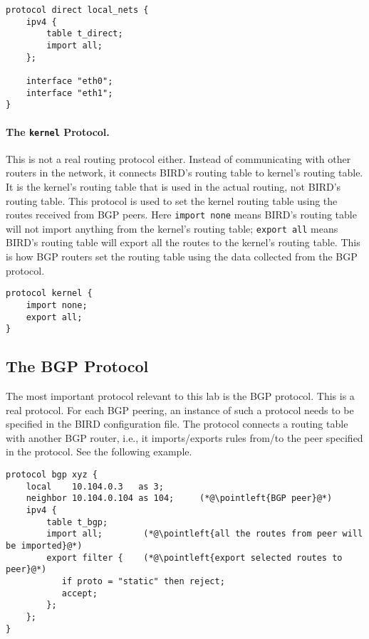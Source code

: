 \begin{lstlisting}
protocol direct local_nets {
    ipv4 {
        table t_direct;
        import all;
    };

    interface "eth0";
    interface "eth1";
}
\end{lstlisting}


\paragraph{The \texttt{kernel} Protocol.} 
This is not a real routing protocol either.
Instead of communicating with other routers in the network, it connects
BIRD's routing table to kernel's routing table. It is the kernel's routing table
that is used in the actual routing, not BIRD's routing table.
This protocol is used to set the kernel routing table using the routes
received from BGP peers. Here
\texttt{import none} means BIRD's routing table will not import anything from
the kernel's routing table; \texttt{export all} means BIRD's routing table
will export all the routes to the kernel's routing table. This is how BGP
routers set the routing table using the data collected from the BGP
protocol.

\begin{lstlisting}
protocol kernel {
    import none;
    export all;
}
\end{lstlisting}



\subsection{The BGP Protocol} 

The most important protocol relevant to this lab is the BGP protocol.
This is a real protocol. For each BGP peering, an instance of 
such a protocol needs to be specified in the BIRD configuration 
file. The protocol connects a routing table with another 
BGP router, i.e., it imports/exports rules from/to 
the peer specified in the protocol.
See the following example. 

\begin{lstlisting}
protocol bgp xyz {
    local    10.104.0.3   as 3;
    neighbor 10.104.0.104 as 104;     (*@\pointleft{BGP peer}@*)
    ipv4 {
        table t_bgp;
        import all;        (*@\pointleft{all the routes from peer will be imported}@*)
        export filter {    (*@\pointleft{export selected routes to peer}@*)
           if proto = "static" then reject;
           accept;
        };
    };
}
\end{lstlisting}

